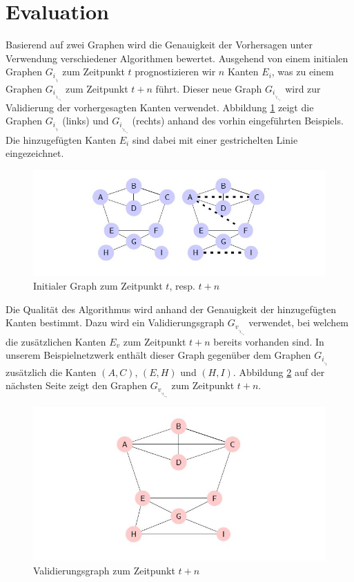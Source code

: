 \section{Evaluation}
Basierend auf zwei Graphen wird die Genauigkeit der Vorhersagen unter Verwendung verschiedener Algorithmen bewertet.
Ausgehend von einem initialen Graphen $G_i_,_t$ zum Zeitpunkt $t$ prognostizieren wir $n$ Kanten $E_i$, was zu einem Graphen $G_i_,_t_+_n$ zum Zeitpunkt $t + n$ führt.
Dieser neue Graph $G_i_,_t_+_n$  wird zur Validierung der vorhergesagten Kanten verwendet.
Abbildung \ref{fig:graph_init} zeigt die Graphen $G_i_,_t$ (links) und $G_i_,_t_+_n$ (rechts) anhand des vorhin eingeführten Beispiels.
Die hinzugefügten Kanten $E_i$ sind dabei mit einer gestrichelten Linie eingezeichnet.

\begin{figure}[h]
    \centering
    \includegraphics{resources/graph_init.JPG}
    \caption{Initialer Graph zum Zeitpunkt $t$, resp. $t + n$}
    \label{fig:graph_init}
\end{figure}

Die Qualität des Algorithmus wird anhand der Genauigkeit der hin\-zu\-ge\-füg\-ten Kanten bestimmt.
Dazu wird ein Validierungsgraph $G_v_,_t_+_n$ verwendet, bei welchem die zusätzlichen Kanten $E_v$ zum Zeitpunkt $t + n$ bereits vorhanden sind.
In unserem Beispielnetzwerk enthält dieser Graph gegenüber dem Graphen $G_i_,_t$ zusätzlich die Kanten $(A,C)$, $(E,H)$ und $(H,I)$.
Abbildung \ref{fig:graph_validation} auf der nächsten Seite zeigt den Graphen $G_v_,_t_+_n$ zum Zeitpunkt $t + n$.

\begin{figure}[h]
    \centering
    \includegraphics{resources/graph_validation.JPG}
    \caption{Validierungsgraph zum Zeitpunkt $t + n$}
    \label{fig:graph_validation}
\end{figure}

